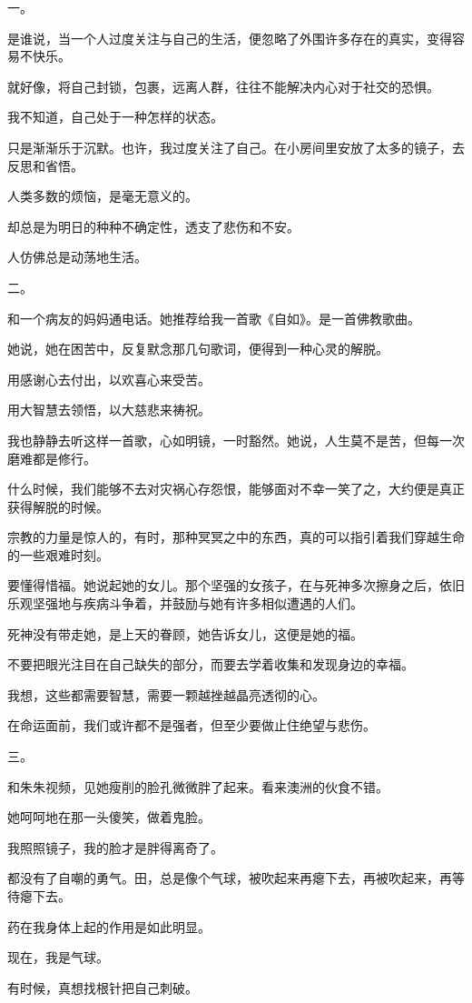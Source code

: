 \documentclass[12pt,a4paper]{article}
\newcommand{\subpart}[1]{
	\begingroup \par
	\vspace{1ex} \centering #1
	\par \endgroup
}
\begin{document}
	\endwriting



		\subpart{一。}
		是谁说，当一个人过度关注与自己的生活，便忽略了外围许多存在的真实，变得容易不快乐。\par
		就好像，将自己封锁，包裹，远离人群，往往不能解决内心对于社交的恐惧。\par
		我不知道，自己处于一种怎样的状态。\par
		只是渐渐乐于沉默。也许，我过度关注了自己。在小房间里安放了太多的镜子，去反思和省悟。\par
		人类多数的烦恼，是毫无意义的。\par
		却总是为明日的种种不确定性，透支了悲伤和不安。\par
		人仿佛总是动荡地生活。


		\subpart{二。}
		和一个病友的妈妈通电话。她推荐给我一首歌《自如》。是一首佛教歌曲。\par
		她说，她在困苦中，反复默念那几句歌词，便得到一种心灵的解脱。

		用感谢心去付出，以欢喜心来受苦。\par
		用大智慧去领悟，以大慈悲来祷祝。

		我也静静去听这样一首歌，心如明镜，一时豁然。她说，人生莫不是苦，但每一次磨难都是修行。\par
		什么时候，我们能够不去对灾祸心存怨恨，能够面对不幸一笑了之，大约便是真正获得解脱的时候。\par
		宗教的力量是惊人的，有时，那种冥冥之中的东西，真的可以指引着我们穿越生命的一些艰难时刻。\par
		要懂得惜福。她说起她的女儿。那个坚强的女孩子，在与死神多次擦身之后，依旧乐观坚强地与疾病斗争着，并鼓励与她有许多相似遭遇的人们。\par
		死神没有带走她，是上天的眷顾，她告诉女儿，这便是她的福。\par
		不要把眼光注目在自己缺失的部分，而要去学着收集和发现身边的幸福。\par
		我想，这些都需要智慧，需要一颗越挫越晶亮透彻的心。\par
		在命运面前，我们或许都不是强者，但至少要做止住绝望与悲伤。

		\subpart{三。}
		和朱朱视频，见她瘦削的脸孔微微胖了起来。看来澳洲的伙食不错。\par
		她呵呵地在那一头傻笑，做着鬼脸。\par
		我照照镜子，我的脸才是胖得离奇了。\par
		都没有了自嘲的勇气。田，总是像个气球，被吹起来再瘪下去，再被吹起来，再等待瘪下去。\par
		药在我身体上起的作用是如此明显。\par
		现在，我是气球。\par
		有时候，真想找根针把自己刺破。
\end{document}
